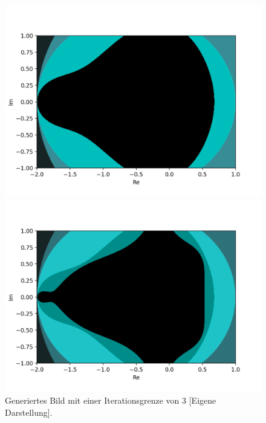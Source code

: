 \begin{figure}[H]
\centering
\begin{minipage}[t]{0.48\textwidth}
  \centering
  \includegraphics[width=\linewidth]{images/maxBorder/3}
  \vspace*{-8ex}
  \caption{Generiertes Bild mit einer Iterationsgrenze von $3$ [Eigene Darstellung].}
  \label{app:8.3}
\end{minipage}%
\hspace{2ex}
\begin{minipage}[t]{0.48\textwidth}
  \centering
  \includegraphics[width=\linewidth]{images/maxBorder/4}
  \vspace*{-8ex}

\end{minipage}
\end{figure}
